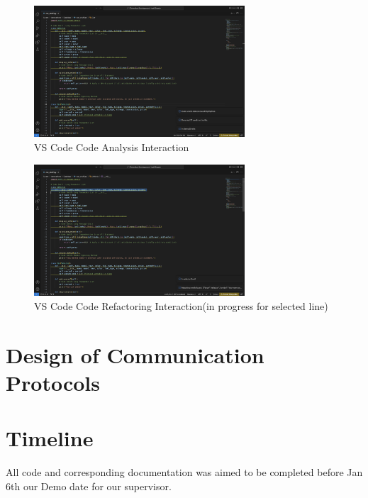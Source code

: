\documentclass[12pt, titlepage]{article}
\begin{document}
  \begin{figure}[H]
  \centering
  \includegraphics[width=0.7\textwidth]{../../Images/VSPluginDetectMode.png}
  \caption{VS Code Code Analysis Interaction}
  \label{fig5}
  \end{figure}
  
  \begin{figure}[H]
  \centering
  \includegraphics[width=0.7\textwidth]{../../Images/VSPluginRefactorMode.png}
  \caption{VS Code Code Refactoring Interaction(in progress for selected line)}
  \label{fig6}
  \end{figure}



\section{Design of Communication Protocols}


\section{Timeline}

All code and corresponding documentation was aimed to be completed before Jan 6th our Demo date for our supervisor.
\end{document}
